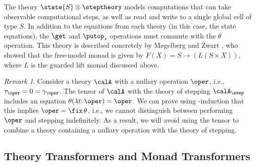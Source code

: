 \documentclass[acmsmall,screen,review,anonymous]{acmart}
\theoremstyle{remark}
\newtheorem{remark}{Remark}
\begin{document}
\begin{example}
  The theory $\state{S} \otimes \steptheory$ models computations that can
  take observable computational steps, as well as read and write to a single
  global cell of type $S$. In addition to the equations from each theory (in
  this case, the state equations), the $\get$ and $\putop_s$ operations must
  commute with the $\theta$ operation. This theory is described concretely by
  Møgelberg and Zwart \cite{lmcs:14660}, who showed that the free-model monad is
  given by $F(X) = S \to (L(S \times X))$, where $L$ is the guarded lift monad
  discussed above.
\end{example}

\begin{remark}\label{remark:tensor-nullary-with-step} Consider a theory $\calA$
  with a nullary operation $\oper$, i.e., $\tau_\oper = 0 = \gamma_\oper$. The
  tensor of $\calA$ with the theory of stepping $\calA_{\step}$ includes an
  equation $\theta(\lambda t.\, \oper) = \oper$. We can prove using
  \lob-induction that this implies $\oper = \fix\, \theta$, i.e., we cannot
  distinguish between performing $\oper$ and stepping indefinitely. As a result,
  we will avoid using the tensor to combine a theory containing a nullary
  operation with the theory of stepping.
\end{remark}

\subsection{Theory Transformers and Monad Transformers}\label{sec:monad-transformers-background}
\end{document}
